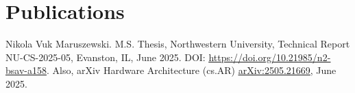 \section{Publications}

\resumeSubHeadingListStart









\vspace{6pt}

\hfill\begin{minipage}{\dimexpr\textwidth-24pt}\small
Nikola Vuk Maruszewski. M.S. Thesis, Northwestern University, Technical Report NU-CS-2025-05,
Evanston, IL, June 2025. DOI:
\href{https://doi.org/10.21985/n2-bsav-a158}{\ul{https://doi.org/10.21985/n2-bsav-a158}}.
Also, arXiv Hardware Architecture (cs.AR)
\href{https://arxiv.org/abs/2505.21669}{\ul{arXiv:2505.21669}}, June 2025. 
\end{minipage}



\vspace{6pt}

